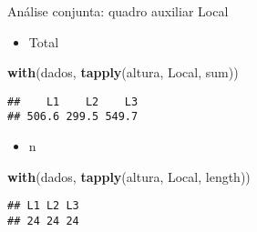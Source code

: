 \documentclass[
  ignorenonframetext,
]{beamer}
\newenvironment{Shaded}{\begin{snugshade}}{\end{snugshade}}
\newcommand{\FunctionTok}[1]{\textcolor[rgb]{0.13,0.29,0.53}{\textbf{#1}}}
\newcommand{\NormalTok}[1]{#1}
\providecommand{\tightlist}{%
  \setlength{\itemsep}{0pt}\setlength{\parskip}{0pt}}
\begin{document}
\begin{frame}[fragile]{Análise conjunta: quadro auxiliar Local}
\protect\hypertarget{anuxe1lise-conjunta-quadro-auxiliar-local}{}
\begin{itemize}
\tightlist
\item
  Total
\end{itemize}

\begin{Shaded}
\begin{Highlighting}[]
\FunctionTok{with}\NormalTok{(dados,}
     \FunctionTok{tapply}\NormalTok{(altura, Local, }
\NormalTok{            sum))}
\end{Highlighting}
\end{Shaded}

\begin{verbatim}
##    L1    L2    L3 
## 506.6 299.5 549.7
\end{verbatim}

\begin{itemize}
\tightlist
\item
  n
\end{itemize}

\begin{Shaded}
\begin{Highlighting}[]
\FunctionTok{with}\NormalTok{(dados,}
     \FunctionTok{tapply}\NormalTok{(altura, Local, }
\NormalTok{            length))}
\end{Highlighting}
\end{Shaded}

\begin{verbatim}
## L1 L2 L3 
## 24 24 24
\end{verbatim}
\end{frame}
\end{document}
